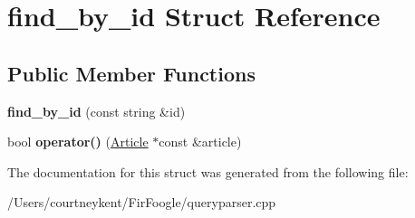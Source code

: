 \hypertarget{structfind__by__id}{\section{find\+\_\+by\+\_\+id Struct Reference}
\label{structfind__by__id}
}
\subsection*{Public Member Functions}
\begin{DoxyCompactItemize}
\item 
\hypertarget{structfind__by__id_a17e4f7f4a1645c9600cf88b5d5240814}{{\bfseries find\+\_\+by\+\_\+id} (const string \&id)}\label{structfind__by__id_a17e4f7f4a1645c9600cf88b5d5240814}

\item 
\hypertarget{structfind__by__id_aaf374a92eb4ad9feb3863c3b01e90059}{bool {\bfseries operator()} (\hyperlink{class_article}{Article} $\ast$const \&article)}\label{structfind__by__id_aaf374a92eb4ad9feb3863c3b01e90059}

\end{DoxyCompactItemize}


The documentation for this struct was generated from the following file\+:\begin{DoxyCompactItemize}
\item 
/\+Users/courtneykent/\+Fir\+Foogle/queryparser.\+cpp\end{DoxyCompactItemize}
